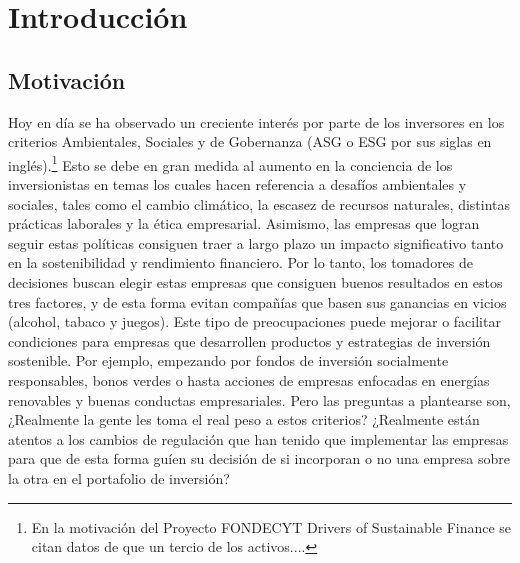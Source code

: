 
\chapter{Introducción}
\label{ch:intro} %





\section{Motivación}

Hoy en día se ha observado un creciente interés por parte de los inversores en los criterios Ambientales, Sociales y de Gobernanza (ASG o ESG por sus siglas en inglés).\footnote{En la motivación del Proyecto FONDECYT Drivers of Sustainable Finance se citan datos de que un tercio de los activos....} Esto se debe en gran medida al aumento en la conciencia de los inversionistas en temas los cuales hacen referencia a desafíos ambientales y sociales, tales como el cambio climático, la escasez de recursos naturales, distintas prácticas laborales y la ética empresarial. Asimismo, las empresas que logran seguir estas políticas consiguen traer a largo plazo un impacto significativo tanto en la sostenibilidad y rendimiento financiero. Por lo tanto, los tomadores de decisiones buscan elegir estas empresas que consiguen buenos resultados en estos tres factores, y de esta forma evitan compañías que basen sus ganancias en vicios (alcohol, tabaco y juegos). Este tipo de preocupaciones puede mejorar o facilitar condiciones para empresas que desarrollen productos y estrategias de inversión sostenible. Por ejemplo, empezando por fondos de inversión socialmente responsables, bonos verdes o hasta acciones de empresas enfocadas en energías renovables y buenas conductas empresariales. Pero las preguntas a plantearse son, ¿Realmente la gente les toma el real peso a estos criterios? ¿Realmente están atentos a los cambios de regulación que han tenido que implementar las empresas para que de esta forma guíen su decisión de si incorporan o no una empresa sobre la otra en el portafolio de inversión?\\

